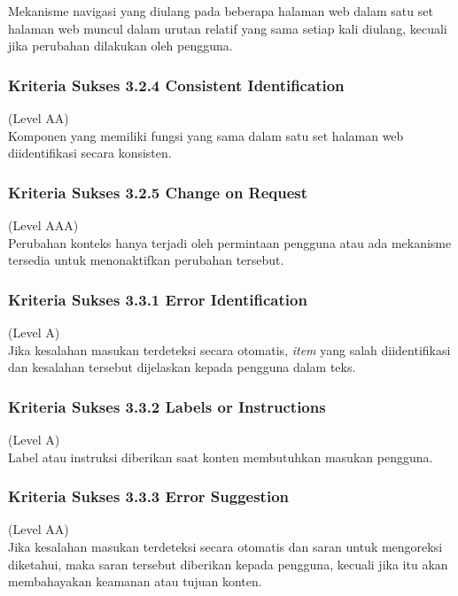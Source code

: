 Mekanisme navigasi yang diulang pada beberapa halaman web dalam satu set halaman web muncul dalam urutan relatif yang sama setiap kali diulang, kecuali jika perubahan dilakukan oleh pengguna.

\subsubsection{Kriteria Sukses 3.2.4 Consistent Identification}
\label{subsubsec:kriteria_3.2.4}
(Level AA) \\

Komponen yang memiliki fungsi yang sama dalam satu set halaman web diidentifikasi secara konsisten.

\subsubsection{Kriteria Sukses 3.2.5 Change on Request}
\label{subsubsec:kriteria_3.2.5}
(Level AAA) \\

Perubahan konteks hanya terjadi oleh permintaan pengguna atau ada mekanisme tersedia untuk menonaktifkan perubahan tersebut.

\subsubsection{Kriteria Sukses 3.3.1 Error Identification}
\label{subsubsec:kriteria_3.3.1}
(Level A) \\

Jika kesalahan masukan terdeteksi secara otomatis, \textit{item} yang salah diidentifikasi dan kesalahan tersebut dijelaskan kepada pengguna dalam teks.

\subsubsection{Kriteria Sukses 3.3.2 Labels or Instructions}
\label{subsubsec:kriteria_3.3.2}
(Level A) \\

Label atau instruksi diberikan saat konten membutuhkan masukan pengguna.

\subsubsection{Kriteria Sukses 3.3.3 Error Suggestion}
\label{subsubsec:kriteria_3.3.3}
(Level AA) \\

Jika kesalahan masukan terdeteksi secara otomatis dan saran untuk mengoreksi diketahui, maka saran tersebut diberikan kepada pengguna, kecuali jika itu akan membahayakan keamanan atau tujuan konten.

